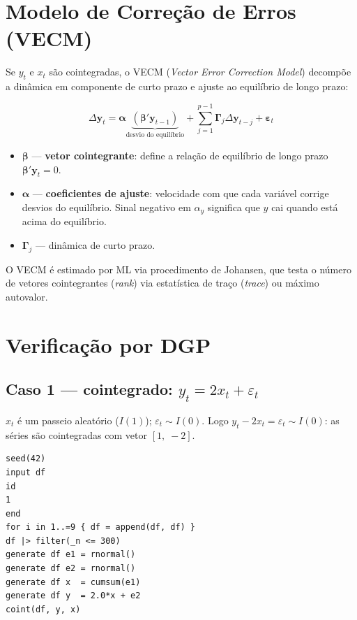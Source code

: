 \section{Modelo de Correção de Erros (VECM)}

Se $y_t$ e $x_t$ são cointegradas, o VECM (\emph{Vector Error Correction
Model}) decompõe a dinâmica em componente de curto prazo e ajuste ao
equilíbrio de longo prazo:

\[
  \Delta \mathbf{y}_t
  = \boldsymbol{\alpha} \underbrace{(\boldsymbol{\beta}' \mathbf{y}_{t-1})}_{\text{desvio do equilíbrio}}
  + \sum_{j=1}^{p-1} \mathbf{\Gamma}_j \Delta \mathbf{y}_{t-j}
  + \boldsymbol{\varepsilon}_t
\]

\begin{itemize}
  \item $\boldsymbol{\beta}$ — \textbf{vetor cointegrante}: define a relação
        de equilíbrio de longo prazo $\boldsymbol{\beta}'\mathbf{y}_t = 0$.
  \item $\boldsymbol{\alpha}$ — \textbf{coeficientes de ajuste}: velocidade
        com que cada variável corrige desvios do equilíbrio. Sinal negativo
        em $\alpha_y$ significa que $y$ cai quando está acima do equilíbrio.
  \item $\mathbf{\Gamma}_j$ — dinâmica de curto prazo.
\end{itemize}

O VECM é estimado por ML via procedimento de Johansen, que testa o número
de vetores cointegrantes (\emph{rank}) via estatística de traço (\emph{trace})
ou máximo autovalor.

\section{Verificação por DGP}

\subsection*{Caso 1 — cointegrado: $y_t = 2 x_t + \varepsilon_t$}

$x_t$ é um passeio aleatório ($I(1)$); $\varepsilon_t \sim I(0)$. Logo
$y_t - 2 x_t = \varepsilon_t \sim I(0)$: as séries são cointegradas com
vetor $[1,\; -2]$.

\begin{lstlisting}[caption={DGP cointegrado e teste de Engle-Granger}]
seed(42)
input df
id
1
end
for i in 1..=9 { df = append(df, df) }
df |> filter(_n <= 300)
generate df e1 = rnormal()
generate df e2 = rnormal()
generate df x  = cumsum(e1)
generate df y  = 2.0*x + e2
coint(df, y, x)
\end{lstlisting}


